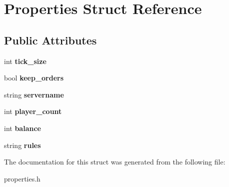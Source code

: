 \hypertarget{struct_properties}{\section{Properties Struct Reference}
\label{struct_properties}
}
\subsection*{Public Attributes}
\begin{DoxyCompactItemize}
\item 
\hypertarget{struct_properties_af81893ae10c90800cc9e9cc7c4584c8b}{int {\bfseries tick\-\_\-size}}\label{struct_properties_af81893ae10c90800cc9e9cc7c4584c8b}

\item 
\hypertarget{struct_properties_af8029e79aa7ccd6a80ceed9ac2277bca}{bool {\bfseries keep\-\_\-orders}}\label{struct_properties_af8029e79aa7ccd6a80ceed9ac2277bca}

\item 
\hypertarget{struct_properties_a4bd2b7c4046e11a6780de734dbd08e30}{string {\bfseries servername}}\label{struct_properties_a4bd2b7c4046e11a6780de734dbd08e30}

\item 
\hypertarget{struct_properties_ae358832dbf2b9b88d210d63e53100dd8}{int {\bfseries player\-\_\-count}}\label{struct_properties_ae358832dbf2b9b88d210d63e53100dd8}

\item 
\hypertarget{struct_properties_a682adde77037f30608f504369ff5ab81}{int {\bfseries balance}}\label{struct_properties_a682adde77037f30608f504369ff5ab81}

\item 
\hypertarget{struct_properties_ab98bca3e274ed9e6e10a5b6b64208836}{string {\bfseries rules}}\label{struct_properties_ab98bca3e274ed9e6e10a5b6b64208836}

\end{DoxyCompactItemize}


The documentation for this struct was generated from the following file\-:\begin{DoxyCompactItemize}
\item 
properties.\-h\end{DoxyCompactItemize}
